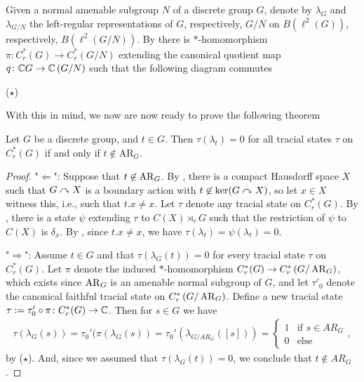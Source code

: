 \noindent Given a normal amenable subgroup $N$ of a discrete group $G$, denote by $\lambda_G$ and $\lambda_{G/N}$ the left-regular representations of $G$, respectively, $G/N$ on $B(\ell^2(G))$, respectively, $B(\ell^2(G/N))$. By \cite[Proposition 3][3]{de2007simplicity} there is $*$-homomorphism $\pi \colon C_r^*(G) \to C_r^*\left(G/N\right)$ extending the canonical quotient map $q \colon \mathbb{C} G \to \mathbb{C} \left(G/N\right)$ such that the following diagram commutes
\begin{center}
 ($\star$)
\end{center}
With this in mind, we now are now ready to prove the following theorem

\begin{theorem}\label{tau 0 iff t not in ARg}
Let $G$ be a discrete group, and $t \in G$. Then $\tau(\lambda_t)=0$ for all tracial states $\tau$ on $C_r^*(G)$ if and only if $t \not\in \mathrm{AR}_G$. 
\begin{proof}
"$\Leftarrow$": Suppose that $t \not\in \operatorname{AR}_G$. By , there is a compact Hausdorff space $X$ such that $G \curvearrowright X$ is a boundary action with $t \not \in \ker(G \curvearrowright X)$, so let $x \in X$ witness this, i.e., such that $t.x \neq x$. Let $\tau$ denote any tracial state on $C_r^*(G)$. By , there is a state $\psi$ extending $\tau$ to $C(X) \rtimes_r G$ such that the restriction of $\psi$ to $C(X)$ is $\delta_x$. By , since $t.x \neq x$, we have $\tau(\lambda_t)=\psi(\lambda_t)=0$. 

\noindent "$\Rightarrow$": Assume $t \in G$ and that $\tau(\lambda_G(t))=0$ for every tracial state $\tau$ on $C_r^*(G)$. Let $\pi$ denote the induced $*$-homomorphism $C_r^*(G) \to C_r^*\left( G/\operatorname{AR}_G\right)$, which exists since $\operatorname{AR}_G$ is an amenable normal subgroup of $G$, and let $\tau'_0$ denote the canonical faithful tracial state on $C_r^*\left(G/ \operatorname{AR}_G\right)$. Define a new tracial state $\tau:= \tau_0' \circ \pi \colon C_r^*(G) \to \mathbb{C}$. Then for $s \in G$ we have
\begin{align*}
\tau(\lambda_G(s))=\tau_0'(\pi (\lambda_G(s))=\tau_0'(\lambda_{G/AR_G}([s]))=\begin{cases}
1 & \text{if } s \in AR_G\\
0 & \text{else}
\end{cases},
\end{align*}
by ($\star$). And, since we assumed that $\tau(\lambda_G(t))=0$, we conclude that $t \not \in AR_G$.
\end{proof}
\end{theorem}

